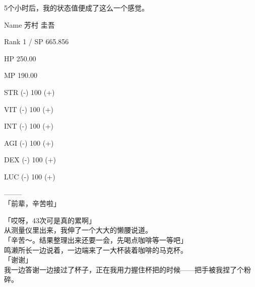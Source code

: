 5个小时后，我的状态值便成了这么一个感觉。\\

\cardline

  Name 芳村 圭吾

  Rank 1 / SP 665.856

  HP  250.00

  MP  190.00

%  
 

  STR (-) 100 (+)

  VIT (-) 100 (+)

  INT (-) 100 (+)

  AGI (-) 100 (+)

  DEX (-) 100 (+)

  LUC (-) 100 (+)

  --------\\

「前辈，辛苦啦」

「哎呀，43次可是真的累啊」\\

从测量仪里出来，我伸了一个大大的懒腰说道。\\

「辛苦～。结果整理出来还要一会，先喝点咖啡等一等吧」\\

鸣濑所长一边说着，一边端来了一大杯装着咖啡的马克杯。\\

「谢谢」\\

我一边答谢一边接过了杯子，正在我用力握住杯把的时候——把手被我捏了个粉碎。\\

